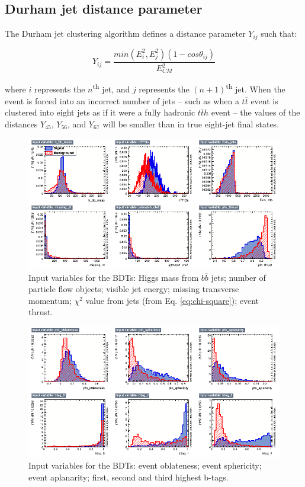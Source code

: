 \subsection{Durham jet distance parameter}
\label{section:durham-distance}
The Durham jet clustering algorithm defines a distance parameter $Y_{ij}$ such that:

\begin{equation}
	Y_{ij} = \frac{min(E_i^2 , E_j^2)(1-cos\theta_{ij})}{E^2_{CM}}
\label{eq:durham-distance}
\end{equation}

where $i$ represents the $n$\textsuperscript{th} jet, and $j$ represents the $(n+1)$\textsuperscript{th} jet. When the event is forced into an incorrect number of jets -- such as when a $t\overline{t}$ event is clustered into eight jets as if it were a fully hadronic $t\overline{t}h$ event -- the values of the distances $Y_{45}$, $Y_{56}$, and $Y_{67}$ will be smaller than in true eight-jet final states. 

\begin{figure}[p]
	\centering
	\includegraphics[width=1.0\textwidth]{../Pictures/Analysis/BDTs/variables_id_c1.png}
	\caption{Input variables for the BDTs: Higgs mass from $b\overline{b}$ jets; number of particle flow objects; visible jet energy; missing transverse momentum; $\chi^2$ value from jets (from Eq. \ref{eq:chi-square}); event thrust.}
	\label{figure:analysis/results/tmva-inputs-1}
\end{figure}

\begin{figure}[p]
	\centering
	\includegraphics[width=1.0\textwidth]{../Pictures/Analysis/BDTs/variables_id_c2.png}
	\caption{Input variables for the BDTs: event oblateness; event sphericity; event aplanarity; first, second and third highest b-tags.}
	\label{figure:analysis/results/tmva-inputs-2}
\end{figure}

